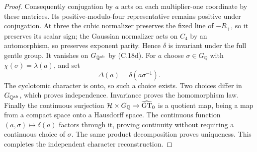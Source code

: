 \begin{proof}
Consequently conjugation by \(a\) acts on each
multiplier-one coordinate by these matrices.
Its positive-modulo-four representative remains
positive under conjugation. At three the cubic
normalizer preserves the fixed line of \(-R_+\),
so it preserves its scalar sign; the Gaussian
normalizer acts on \(C_4\) by an automorphism,
so preserves exponent parity. Hence \(\delta\)
is invariant under the full gentle group. It vanishes
on \(G_{\mathbb Q^{\rm ab}}\) by (C.18d).
For \(a\) choose \(\sigma\in G_{\mathbb Q}\) with
\(\chi(\sigma)=\lambda(a)\), and set
\[
 \Delta(a)=\delta(a\sigma^{-1}).
 \tag{C.18m}
\]
The cyclotomic character is onto, so such a choice
exists. Two choices differ in \(G_{\mathbb Q^{\rm ab}}\),
which proves independence. Invariance proves the
homomorphism law. Finally the continuous surjection
\(\mathcal H\times G_{\mathbb Q}\to\widehat{\rm GT}_0\)
is a quotient map, being a map from a compact space
onto a Hausdorff space. The continuous function
\((a,\sigma)\mapsto\delta(a)\) factors through it,
proving continuity without requiring a continuous
choice of \(\sigma\). The same product decomposition
proves uniqueness. This completes the independent
character reconstruction.


\end{proof}

